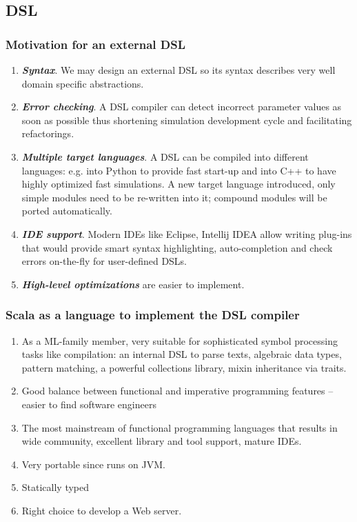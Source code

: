 \documentclass{beamer}
\begin{document}
\subsection{DSL}
\begin{frame}
\frametitle{Motivation for an external DSL}
\begin{enumerate}
  \item \textbf{\textit{Syntax}}. We may design an external DSL so its syntax describes very well domain specific abstractions.
  \item \textbf{\textit{Error checking}}. A DSL compiler can detect incorrect parameter values as soon as possible thus shortening simulation development cycle and facilitating refactorings.
  \item \textbf{\textit{Multiple target languages}}. A DSL can be compiled into different languages: e.g. into Python to provide fast start-up and into C++ to have highly optimized fast simulations. A new target language introduced, only simple modules need to be re-written into it; compound modules will be ported automatically.
  \item \textbf{\textit{IDE support}}. Modern IDEs like Eclipse, Intellij IDEA allow writing plug-ins that would provide smart syntax highlighting, auto-completion and check errors on-the-fly for user-defined DSLs.
  \item \textbf{\textit{High-level optimizations}} are easier to implement.
\end{enumerate}
\end{frame}
\begin{frame}
\frametitle{Scala as a language to implement the DSL compiler}
\begin{enumerate}
  \item As a ML-family member, very suitable for sophisticated symbol processing tasks like compilation: an internal DSL to parse texts, algebraic data types, pattern matching, a powerful collections library, mixin inheritance via traits.
  \item Good balance between functional and imperative programming features -- easier to find software engineers
  \item The most mainstream of functional programming languages that results in wide community, excellent library and tool support, mature IDEs.
  \item Very portable since runs on JVM.
  \item Statically typed
  \item Right choice to develop a Web server.
\end{enumerate}
\end{frame}
\end{document}
